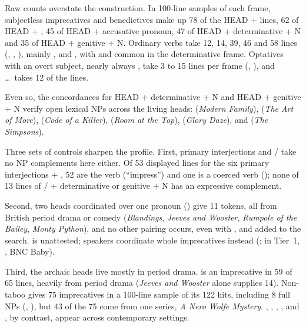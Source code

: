 \documentclass[12pt]{article}
\begin{document}
Raw counts overstate the construction. In 100-line samples of each frame, subjectless imprecatives and benedictives make up 78 of the HEAD +  lines, 62 of HEAD + , 45 of HEAD + accusative pronoun, 47 of HEAD + determinative + N and 35 of HEAD + genitive + N. Ordinary verbs take 12, 14, 39, 46 and 58 lines (, , ), mainly ,  and , with  and  common in the determinative frame. Optatives with an overt subject, nearly always , take 3 to 15 lines per frame (, ), and \dots\ takes 12 of the  lines.

Even so, the concordances for HEAD + determinative + N and HEAD + genitive + N verify open lexical NPs across the living heads:  (\emph{Modern Family}),  (\emph{The Art of More}),  (\emph{Code of a Killer}),  (\emph{Room at the Top}),  (\emph{Glory Daze}), and  (\emph{The Simpsons}).

Three sets of controls sharpen the profile. First, primary interjections and / take no NP complements here either. Of 53 displayed lines for the six primary interjections + , 52 are the verb  (\enquote{impress}) and one is a coerced verb (); none of 13 lines of / + determinative or genitive + N has an expressive complement.

Second, two heads coordinated over one pronoun () give 11 tokens, all from British period drama or comedy (\emph{Blandings}, \emph{Jeeves and Wooster}, \emph{Rumpole of the Bailey}, \emph{Monty Python}), and no other pairing occurs, even with ,  and  added to the search.  is unattested; speakers coordinate whole imprecatives instead (; in Tier~1, , BNC Baby).

Third, the archaic heads live mostly in period drama.  is an imprecative in 59 of 65 lines, heavily from period drama (\emph{Jeeves and Wooster} alone supplies 14). Non-taboo  gives 75 imprecatives in a 100-line sample of its 122 hits, including 8 full NPs (, ), but 43 of the 75 come from one series, \emph{A Nero Wolfe Mystery}. , , , ,  and , by contrast, appear across contemporary settings.
\end{document}
